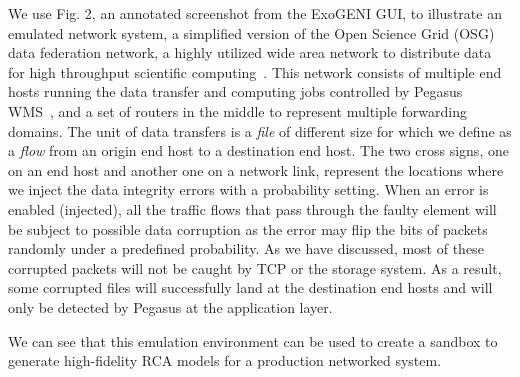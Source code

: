 We use Fig. 2, an annotated screenshot from the ExoGENI GUI, to illustrate an emulated network system, a simplified version of the Open Science Grid (OSG) data federation network, a highly utilized wide area network to distribute data for high throughput scientific computing~\cite{OSG:web}. This network consists of multiple end hosts running the data transfer and computing jobs controlled by Pegasus WMS~\cite{deelman-fgcs-2015}, and a set of routers in the middle to represent multiple forwarding domains. The unit of data transfers is a {\it file} of different size for which we define as a {\it flow} from an origin end host to a destination end host. The two cross signs, one on an 
end host and another one on a network link, represent the locations where we inject the data integrity errors with a probability setting. When an error is enabled (injected), all the traffic flows that pass through the faulty element will be subject to possible data corruption as the error may flip the bits of packets randomly under a predefined probability. As we have discussed, most of these corrupted packets will not be caught by TCP or the storage system. As a result, some corrupted files will successfully land at the destination end hosts and will only be detected by Pegasus at the application layer. 

We can see that this emulation environment can be used to create a sandbox to generate high-fidelity RCA models for a production networked system. 